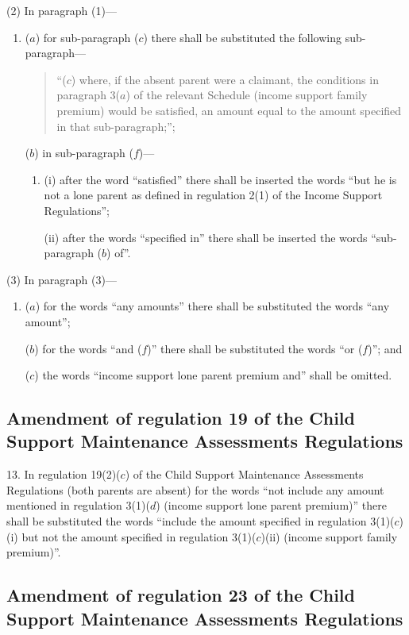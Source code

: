 \documentclass[a4paper]{article}
\begin{document}
(2) In paragraph (1)—
\begin{enumerate}\item[]
($a$) for sub-paragraph ($c$) there shall be substituted the following sub-paragraph—
\begin{quotation}
“($c$) where, if the absent parent were a claimant, the conditions in paragraph 3($a$) of the relevant Schedule (income support family premium) would be satisfied, an amount equal to the amount specified in that sub-paragraph;”;
\end{quotation}

($b$) in sub-paragraph ($f$)—
\begin{enumerate}\item[]
(i) after the word “satisfied” there shall be inserted the words “but he is not a lone parent as defined in regulation 2(1) of the Income Support Regulations”;

(ii) after the words “specified in” there shall be inserted the words “sub-paragraph ($b$) of”.
\end{enumerate}
\end{enumerate}

(3) In paragraph (3)—
\begin{enumerate}\item[]
($a$) for the words “any amounts” there shall be substituted the words “any amount”;

($b$) for the words “and ($f$)” there shall be substituted the words “or ($f$)”; and

($c$) the words “income support lone parent premium and” shall be omitted.
\end{enumerate}

\subsection[13. Amendment of regulation 19 of the Child Support Maintenance Assessments Regulations]{\sloppy Amendment of regulation 19 of the Child Support Maintenance Assessments Regulations}

13.  In regulation 19(2)($c$) of the Child Support Maintenance Assessments Regulations (both parents are absent) for the words “not include any amount mentioned in regulation 3(1)($d$) (income support lone parent premium)” there shall be substituted the words “include the amount specified in regulation 3(1)($c$)(i) but not the amount specified in regulation 3(1)($c$)(ii) (income support family premium)”.

\subsection[14. Amendment of regulation 23 of the Child Support Maintenance Assessments Regulations]{\sloppy Amendment of regulation 23 of the Child Support Maintenance Assessments Regulations}
\end{document}
